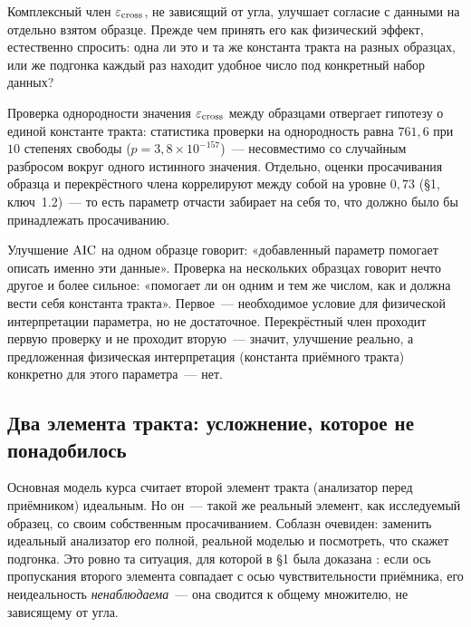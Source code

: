 Комплексный член $\varepsilon_{\rm cross}$, не зависящий от угла, улучшает согласие с данными на
отдельно взятом образце. Прежде чем принять его как физический эффект, естественно спросить:
одна ли это и та же константа тракта на разных образцах, или же подгонка каждый раз находит
удобное число под конкретный набор данных?

\begin{example}
Проверка однородности значения $\varepsilon_{\rm cross}$ между образцами отвергает гипотезу о
единой константе тракта: статистика проверки на однородность равна $761{,}6$ при $10$ степенях
свободы ($p=3{,}8\times10^{-157}$)~--- несовместимо со случайным разбросом вокруг одного истинного
значения. Отдельно, оценки просачивания образца и перекрёстного члена коррелируют между собой на
уровне $0{,}73$ (§1, ключ~1.2)~--- то есть параметр отчасти забирает на себя то, что должно было
бы принадлежать просачиванию.
\end{example}

\begin{intuition}
Улучшение $\operatorname{AIC}$ на одном образце говорит: «добавленный параметр помогает описать именно эти
данные». Проверка на нескольких образцах говорит нечто другое и более сильное: «помогает ли он
одним и тем же числом, как и должна вести себя константа тракта». Первое~--- необходимое условие
для физической интерпретации параметра, но не достаточное. Перекрёстный член проходит первую
проверку и не проходит вторую~--- значит, улучшение реально, а предложенная физическая
интерпретация (константа приёмного тракта) конкретно для этого параметра~--- нет.
\end{intuition}

\subsection{Два элемента тракта: усложнение, которое не понадобилось}
\label{subsec:two-wgp}

Основная модель курса считает второй элемент тракта (анализатор перед приёмником) идеальным. Но
он~--- такой же реальный элемент, как исследуемый образец, со своим собственным просачиванием.
Соблазн очевиден: заменить идеальный анализатор его полной, реальной моделью и посмотреть, что
скажет подгонка. Это ровно та ситуация, для которой в §1 была доказана : если ось пропускания второго элемента совпадает с осью чувствительности
приёмника, его неидеальность \emph{ненаблюдаема}~--- она сводится к общему множителю, не
зависящему от угла.

